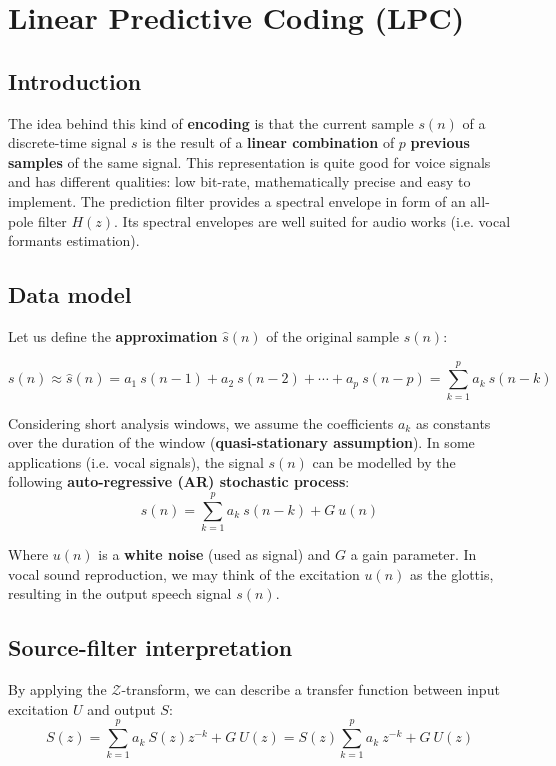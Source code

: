 \section{Linear Predictive Coding (LPC)}

\subsection{Introduction}

The idea behind this kind of \textbf{encoding} is that the current sample $s(n)$ of a discrete-time signal $ s $ is the result of a \textbf{linear combination} of $p$ \textbf{previous samples} of the same signal.
This representation is quite good for voice signals and has different qualities: low bit-rate, mathematically precise and easy to implement.
The prediction filter provides a spectral envelope in form of an all-pole filter $H(z)$.
Its spectral envelopes are well suited for audio works (i.e. vocal formants estimation).

\subsection{Data model}

Let us define the \textbf{approximation} $ \hat{s}(n) $ of the original sample $s(n)$:

\[ s(n) \approx \hat{s}(n) = a_1 \ s(n-1) + a_2 \ s(n-2) + \cdots + a_p \ s(n-p) = \sum_{k=1}^p a_k \ s(n-k) \]

Considering short analysis windows, we assume the coefficients $a_k$ as constants over the duration of the window (\textbf{quasi-stationary assumption}).
In some applications (i.e. vocal signals), the signal $s(n)$ can be modelled by the following \textbf{auto-regressive (AR) stochastic process}:
\[ s(n) =  \sum_{k=1}^p a_k \ s(n-k) + G \ u(n) \]

Where $u(n)$ is a \textbf{white noise} (used as  signal) and $G$ a gain parameter.
In vocal sound reproduction, we may think of the excitation $u(n)$ as the glottis, resulting in the output speech signal $s(n)$.

\subsection{Source-filter interpretation}

By applying the $\mathcal{Z}$-transform, we can describe a transfer function between input excitation $U$ and output $S$:
\[ S(z) =  \sum_{k=1}^p a_k \ S(z) z^{-k} + G \ U(z) = S(z) \sum_{k=1}^p a_k \ z^{-k} + G \ U(z) \]

